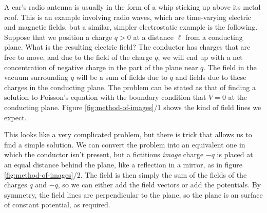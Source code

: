A car's radio antenna is usually in the form of a whip sticking up above its metal roof.
This is an example involving radio waves, which are time-varying electric and magnetic fields,
but a similar, simpler electrostatic example is the following. Suppose that we position a charge $q>0$
at a distance $\ell$ from a conducting plane. What is the resulting electric field? The conductor has
charges that are free to move, and due to the field of the charge $q$, we will end up with a
net concentration of negative charge in the part of the plane near $q$. The field in the vacuum surrounding
$q$ will be a sum of fields due to $q$ and fields due to these charges in the conducting plane.
The problem can be stated as that of finding a solution to Poisson's equation with the boundary
condition that $V=0$ at the conducting plane. Figure \ref{fig:method-of-images}/1 shows the
kind of field lines we expect.


This looks like a very complicated problem, but there is trick that allows us to find
a simple solution. We can convert the problem into an equivalent one in which the conductor
isn't present, but a fictitious \emph{image} charge $-q$ is placed at an equal distance behind
the plane, like a reflection in a mirror, as in figure
\ref{fig:method-of-images}/2. The field is then simply the sum of the fields of the
charges $q$ and $-q$, so we can either add the field vectors or add the potentials. By symmetry, the
field lines are perpendicular to the plane, so the plane is an surface of constant potential, as required.
